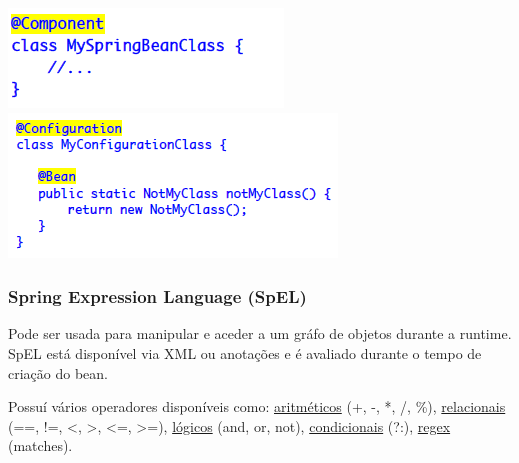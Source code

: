 \documentclass{article}
\begin{document}
\begin{center}
  \includegraphics[scale=0.5]{81}
  \includegraphics[scale=0.5]{82}
\end{center}

\subsubsection{Spring Expression Language (SpEL)}

Pode ser usada para manipular e aceder a um gráfo de objetos durante a runtime. SpEL está disponível
via XML ou anotações e é avaliado durante o tempo de criação do bean.

Possuí vários operadores disponíveis como:
\uline{aritméticos} (+, -, *, /, \%), \uline{relacionais} (==, !=, <, >, <=, >=),
\uline{lógicos} (and, or, not), \uline{condicionais} (?:), \uline{regex} (matches).

\pagebreak
\end{document}
